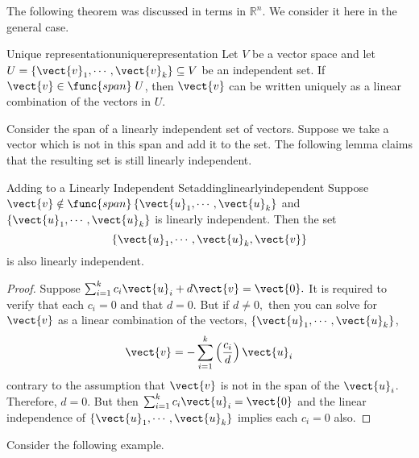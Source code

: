 The following theorem was discussed in terms in $\mathbb{R}^n$. We consider it here in the general case.

\begin{theorem}{Unique representation}{uniquerepresentation}
Let $V$ be a vector space and let $U = \left\{ \vect{v}_1, \cdots, \vect{v}_k \right\} \subseteq V$ be an independent set. If $\vect{v} \in \func{span} \;U$, then $\vect{v}$ can be written uniquely as a linear combination of the vectors in $U$. 
\end{theorem}

Consider the span of a linearly independent set of vectors. Suppose we take a vector which is not in this span and add it to the set. The following lemma claims that the resulting set is still linearly independent. 

\begin{lemma}{Adding to a Linearly Independent Set}{addinglinearlyindependent}
Suppose $\vect{v}\notin \func{span}\left\{ \vect{u}_{1},\cdots ,\vect{u}_{k}\right\} $ and $\left\{ \vect{u}_{1},\cdots ,
\vect{u}_{k}\right\} $ is linearly independent. Then the set
\begin{equation*}
\left\{ \vect{u}_{1},\cdots ,\vect{u}_{k},\vect{v} \right\}
\end{equation*}
is also linearly independent.
\end{lemma}

\begin{proof}
Suppose $\sum_{i=1}^{k}c_{i}\vect{u}_{i}+d\vect{v}=
\vect{0}.$ It is required to verify that each $c_{i}=0$ and that $d=0.$
But if $d\neq 0,$ then you can solve for $\vect{v}$ as a linear
combination of the vectors, $\left\{ \vect{u}_{1},\cdots ,\vect{u}
_{k}\right\} $, 
\begin{equation*}
\vect{v}=-\sum_{i=1}^{k}\left( \frac{c_{i}}{d}\right) \vect{u}_{i}
\end{equation*}
contrary to the assumption that $\vect{v}$ is not in the span of the $\vect{u}_{i}$. Therefore, $d=0.$ But then $\sum_{i=1}^{k}c_{i}
\vect{u}_{i}=\vect{0}$ and the linear independence of $\left\{ \vect{u}
_{1},\cdots ,\vect{u}_{k}\right\} $ implies each $c_{i}=0$ also. 
\end{proof}

Consider the following example.

